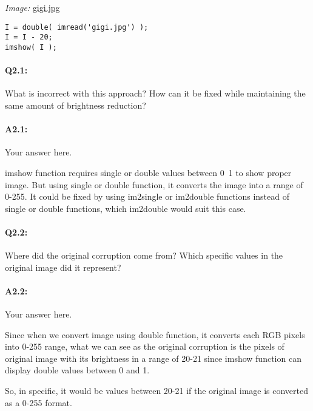 \documentclass[11pt]{article}
\begin{document}
\emph{Image:} \href{gigi.jpg}{gigi.jpg}

\begin{lstlisting}[style=Matlab-editor]
I = double( imread('gigi.jpg') );
I = I - 20;
imshow( I );
\end{lstlisting}

\paragraph{Q2.1:} What is incorrect with this approach? How can it be fixed while maintaining the same amount of brightness reduction?

\paragraph{A2.1:} Your answer here.

imshow function requires single or double values between 0~1 to show proper image. But using single or double function, it converts the image into a range of 0-255. It could be fixed by using im2single or im2double functions instead of single or double functions, which im2double would suit this case.


\pagebreak
\paragraph{Q2.2:} Where did the original corruption come from? Which specific values in the original image did it represent?

\paragraph{A2.2:} Your answer here.

Since when we convert image using double function, it converts each RGB pixels into 0-255 range, what we can see as the original corruption is the pixels of original image with its brightness in a range of 20-21 since imshow function can display double values between 0 and 1.

So, in specific, it would be values between 20-21 if the original image is converted as a 0-255 format.

\end{document}
